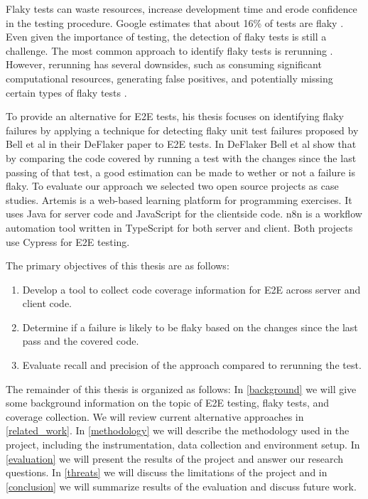 Flaky tests can waste resources, increase development time and erode confidence in the testing procedure. Google estimates that about 16\% of tests are flaky \cite{micco_state_2017}. Even given the importance of testing, the detection of flaky tests is still a challenge. The most common approach to identify flaky tests is rerunning \cite{lam_idflakies_2019}. However, rerunning has several downsides, such as consuming significant computational resources, generating false positives, and potentially missing certain types of flaky tests \cite{bell_deflaker_2018, luo_empirical_2014}.

To provide an alternative for \ac{E2E} tests, his thesis focuses on identifying flaky failures by applying a technique for detecting flaky unit test failures proposed by Bell et al in their DeFlaker paper \cite{bell_deflaker_2018} to \ac{E2E} tests. In DeFlaker Bell et al show that by comparing the code covered by running a test with the changes since the last passing of that test, a good estimation can be made to wether or not a failure is flaky. To evaluate our approach we selected two open source projects as case studies. Artemis \cite{krusche_artemis_2018} is a web-based learning platform for programming exercises. It uses Java for server code and JavaScript for the clientside code. n8n \cite{noauthor_n8n_2023} is a workflow automation tool written in TypeScript for both server and client. Both projects use Cypress \cite{noauthor_cypress-iocypress_2023} for \ac{E2E} testing.

The primary objectives of this thesis are as follows:
\begin{enumerate}
	\item Develop a tool to collect code coverage information for \ac{E2E} across server and client code.
	\item Determine if a failure is likely to be flaky based on the changes since the last pass and the covered code.
	\item Evaluate recall and precision of the approach compared to rerunning the test.
\end{enumerate}

The remainder of this thesis is organized as follows:
In \cref{background} we will give some background information on the topic of \ac{E2E} testing, flaky tests, and coverage collection. 
We will review current alternative approaches in \cref{related_work}.
In \cref{methodology} we will describe the methodology used in the project, including the instrumentation, data collection and environment setup.
In \cref{evaluation} we will present the results of the project and answer our research questions. 
In \cref{threats} we will discuss the limitations of the project and in \cref{conclusion} we will summarize results of the evaluation and discuss future work.



